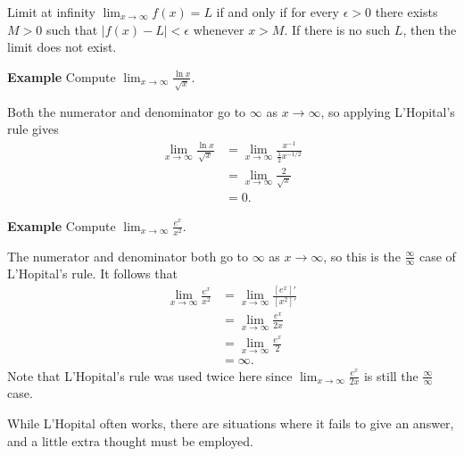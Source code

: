 \documentclass[twoside,openright,titlepage,a4paper]{book}
\begin{document}
\begin{sloppypar}
\begin{definitionbox}
Limit at infinity $\displaystyle \lim_{x \rightarrow \infty} f(x) = L$ if and only if for every $\epsilon>0$ there exists $M>0$ such that $|f(x)-L|<\epsilon$ whenever $x>M$. If there is no such $L$, then the limit does not exist.
\end{definitionbox}

\textbf{Example} Compute $\displaystyle \lim_{x \rightarrow \infty} \frac{\ln x}{\sqrt{x}}$. 
\begin{examplebox}
Both the numerator and denominator go to $\infty$ as $x \rightarrow \infty$, so applying L'Hopital's rule gives
\begin{align*}
\lim_{x \rightarrow \infty} \frac{\ln x}{\sqrt{x}} &= \lim_{x \rightarrow \infty} \frac{x^{-1}}{\frac{1}{2}x^{-1/2}} \\
&= \lim_{x \rightarrow \infty} \frac{2}{\sqrt{x}} \\
&= 0.
\end{align*}
\end{examplebox}

\textbf{Example} Compute $\displaystyle \lim_{x \rightarrow \infty} \frac{e^{x}}{x^2}$.
\begin{examplebox}
The numerator and denominator both go to $\infty$ as $x \rightarrow \infty$, so this is the $\frac{\infty}{\infty}$ case of L'Hopital's rule. It follows that 
\begin{align*} 
\lim_{x\rightarrow \infty} \frac{e^x}{x^2} &= \lim_{x\rightarrow \infty} \frac{[e^x]'}{[x^2]'} \\
&= \lim_{x\rightarrow \infty} \frac{e^x}{2x} \\
&= \lim_{x \rightarrow \infty} \frac{e^x}{2} \\
&= \infty. 
\end{align*}
Note that L'Hopital's rule was used twice here since $\lim_{x\rightarrow \infty} \frac{e^x}{2x}$ is still the $\frac{\infty}{\infty}$ case.
\end{examplebox}

While L'Hopital often works, there are situations where it fails to give an answer, and a little extra thought must be employed.


\end{sloppypar}
\end{document}
